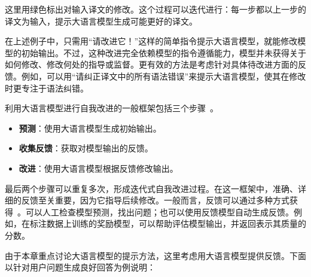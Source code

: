 \noindent 这里用绿色标出对输入译文的修改。这个过程可以迭代进行：每一步都以上一步的译文为输入，提示大语言模型生成可能更好的译文。

在上述例子中，只需用“请改进它！”这样的简单指令提示大语言模型，就能修改模型的初始输出。不过，这种改进完全依赖模型的指令遵循能力，模型并未获得关于如何修改、修改何处的指导或监督。更有效的方法是考虑针对具体待改进方面的反馈。例如，可以用“请纠正译文中的所有语法错误”来提示大语言模型，使其在修改时更专注于语法纠错。

利用大语言模型进行自我改进的一般框架包括三个步骤~\cite{madaan-etal:2024self}。

\begin{itemize}
\item \vspace{0.5em} \textbf{预测}：使用大语言模型生成初始输出。
\item \vspace{0.2em} \textbf{收集反馈}：获取对模型输出的反馈。
\item \vspace{0.2em} \textbf{改进}：使用大语言模型根据反馈修改输出。
\end{itemize}
\vspace{0.5em}

最后两个步骤可以重复多次，形成迭代式自我改进过程。在这一框架中，准确、详细的反馈至关重要，因为它指导后续修改。一般而言，反馈可以通过多种方式获得~\cite{fernandes-etal:2023bridging,pan-etal:2024automatically}。可以人工检查模型预测，找出问题；也可以使用反馈模型自动生成反馈。例如，在标注数据上训练的奖励模型，可以帮助评估模型输出，并返回表示其质量的分数。

由于本章重点讨论大语言模型的提示方法，这里考虑用大语言模型提供反馈。下面以针对用户问题生成良好回答为例说明：

